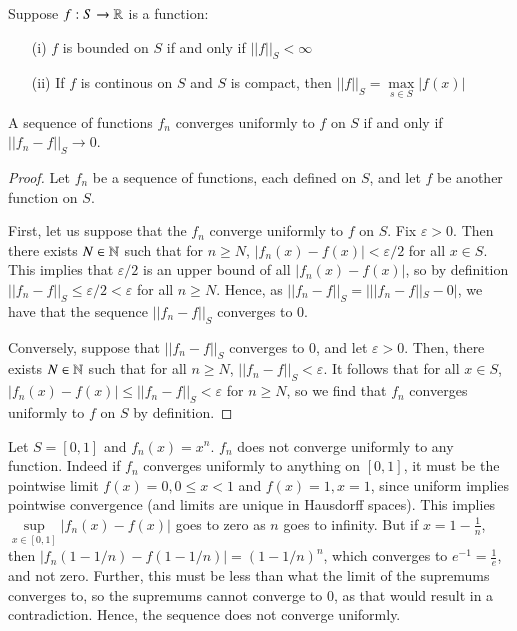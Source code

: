 \begin{rmk}
    Suppose $f:S\rightarrow \mathbb R$ is a function: \begin{enumerate}
        \item[(i)] $f$ is bounded on $S$ if and only if $||f||_S < \infty$
        \item[(ii)] If $f$ is continous on $S$ and $S$ is compact, then $||f||_S = \max\limits_{s \in S}|f(x)|$
    \end{enumerate}
\end{rmk}


\begin{prop}
    A sequence of functions $f_n$ converges uniformly to $f$ on $S$ if and only if $||f_n-f||_S\rightarrow 0$.
\end{prop}
\begin{proof}
    Let $f_n$ be a sequence of functions, each defined on $S$, and let $f$ be another function on $S$.

    First, let us suppose that the $f_n$ converge uniformly to $f$ on $S$. Fix $\varepsilon > 0$. Then there exists $N \in \mathbb N$ such that for $n \geq N$, $|f_n(x) - f(x)| < \varepsilon/2$ for all $x \in S$. This implies that $\varepsilon/2$ is an upper bound of all $|f_n(x)-f(x)|$, so by definition $||f_n-f||_S \leq \varepsilon/2 < \varepsilon$ for all $n \geq N$. Hence, as $||f_n-f||_S = |||f_n -f||_S - 0|$, we have that the sequence $||f_n-f||_S$ converges to $0$.

    Conversely, suppose that $||f_n-f||_S$ converges to $0$, and let $\varepsilon > 0$. Then, there exists $N \in \mathbb N$ such that for all $n \geq N$, $||f_n-f||_S < \varepsilon$. It follows that for all $x \in S$, $|f_n(x) - f(x)| \leq ||f_n-f||_S < \varepsilon$ for $n \geq N$, so we find that $f_n$ converges uniformly to $f$ on $S$ by definition.
\end{proof}

\begin{eg}
    Let $S = [0,1]$ and $f_n(x) = x^n$. $f_n$ does not converge uniformly to any function. Indeed if $f_n$ converges uniformly to anything on $[0,1]$, it must be the pointwise limit $f(x) = 0, 0 \leq x < 1$ and $f(x) = 1, x =1$, since uniform implies pointwise convergence (and limits are unique in Hausdorff spaces). This implies $\sup\limits_{x \in [0,1]}|f_n(x) - f(x)|$ goes to zero as $n$ goes to infinity. But if $x = 1-\frac{1}{n}$, then $|f_n(1-1/n)-f(1-1/n)| = (1-1/n)^n$, which converges to $e^{-1} = \frac{1}{e}$, and not zero. Further, this must be less than what the limit of the supremums converges to, so the supremums cannot converge to $0$, as that would result in a contradiction. Hence, the sequence does not converge uniformly.
\end{eg}

